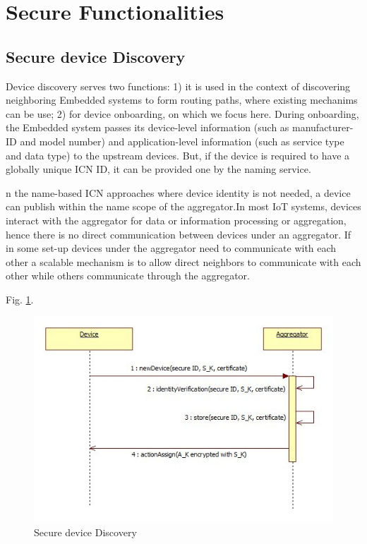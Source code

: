\section{Secure Functionalities}
\label{sec:technique-in-depth}

\subsection{Secure device Discovery}
 Device discovery serves two functions: 1) it is used in the context of discovering neighboring Embedded systems to form routing paths, where existing mechanims can be use; 2) for device onboarding, on which we focus here. During onboarding, the Embedded system passes its device-level information (such as manufacturer-ID and model number) and application-level information (such as service type and data type) to the upstream devices. But, if the device is required to have a globally unique ICN ID, it can be provided one by the naming service.\par
 n the name-based ICN approaches where device identity is not needed, a device can publish within the name scope of the aggregator.In most IoT systems, devices interact with the aggregator for data or information processing or aggregation, hence there is no direct communication between devices under an aggregator. If in some set-up devices under the aggregator need to communicate with each other a scalable mechanism is to allow direct neighbors to communicate with each other while others communicate through the aggregator.
 
 Fig. \ref{fig:Secure device Discovery}.
 \begin{figure}[h]
	\centering
	\includegraphics[width=0.8\linewidth]{Figures/Secure-device-discovery-with-pre-load-secure-keys.png}
	\caption[]{Secure device Discovery}
	\label{fig:Secure device Discovery}
\end{figure}

